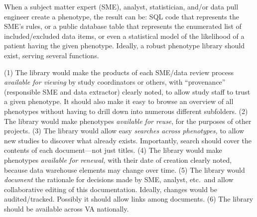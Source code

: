 \documentclass{tufte-handout}
\begin{document}
When a subject matter expert (SME), analyst, statistician, and/or data
pull engineer create a phenotype, the result can be: SQL code that
represents the SME's rules, or a public database table that represents
the enumerated list of included/excluded data items, or even a
statistical model of the likelihood of a patient having the given
phenotype. Ideally, a robust phenotype library should exist, serving
several functions.

(1) The library would make the products of each SME/data review
process \emph{available for viewing} by study coordinators or others,
with ``provenance'' (responsible SME and data extractor) clearly
noted, to allow study staff to trust a given phenotype. It should also
make it easy to browse an overview of all phenotypes without having to
drill down into numerous different subfolders. (2) The library would
make phenotypes \emph{available for reuse}, for the purposes of other
projects. (3) The library would allow easy \emph{searches across
  phenotypes,} to allow new studies to discover what already exists.
Importantly, search should cover the contents of each document---not
just titles. (4) The library would make phenotypes \emph{available for
  renewal,} with their date of creation clearly noted, because data
warehouse elements may change over time. (5) The library would
\emph{document} the rationale for decisions made by SME, analyst,
etc.\ and allow collaborative editing of this documentation. Ideally,
changes would be audited/tracked. Possibly it should allow links among
documents. (6) The library should be available across VA nationally.
\end{document}
